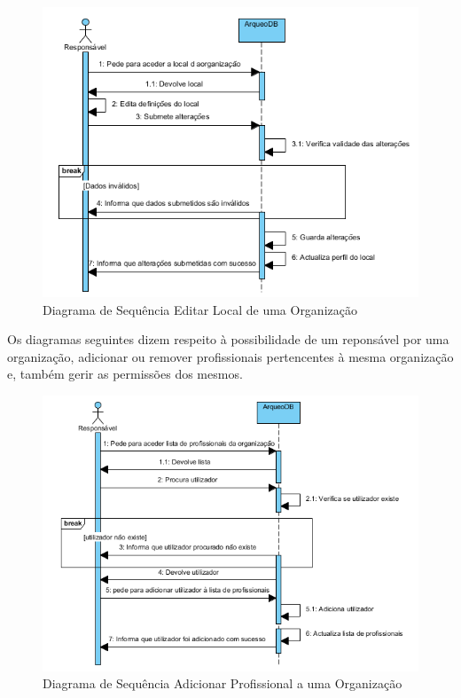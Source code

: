 ﻿\documentclass[12pt,a4paper]{article}
\begin{document}
\begin{figure}[h!]
\centering
\includegraphics[scale=1]{sequencia/editarlocal}
\caption{Diagrama de Sequência Editar Local de uma Organização}  
\end{figure}

\clearpage
Os diagramas seguintes dizem respeito à possibilidade de um reponsável por uma organização, adicionar ou remover profissionais pertencentes à mesma organização e, também gerir as permissões dos mesmos.\\

\begin{figure}[h!]
\centering
\includegraphics[scale=1]{sequencia/adicionarprofissional}
\caption{Diagrama de Sequência Adicionar Profissional a uma Organização} 
\end{figure}  
\end{document}
